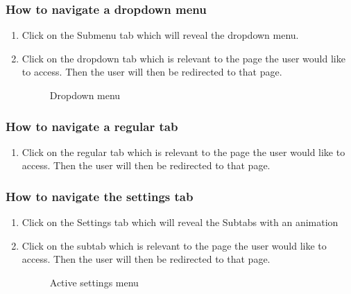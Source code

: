 \documentclass[14pt, a4paper]{article}
\begin{document}
\subsubsection{How to navigate a dropdown menu}
\begin{enumerate}
\item Click on the Submenu tab which will reveal the dropdown menu.
\item Click on the dropdown tab which is relevant to the page the user would like to access. Then the user will then be redirected to that page.
\begin{figure}[H]
\centerline{}
\caption{Dropdown menu}
\label{fig:navbar3}
\end{figure}
\end{enumerate}
\subsubsection{How to navigate a regular tab}
\begin{enumerate}
\item Click on the regular tab which is relevant to the page the user would like to access. Then the user will then be redirected to that page.
\end{enumerate}
\subsubsection{How to navigate the settings tab}
\begin{enumerate}
\item Click on the Settings tab which will reveal the Subtabs with an animation
\item Click on the subtab which is relevant to the page the user would like to access. Then the user will then be redirected to that page.
\begin{figure}[H]
\centerline{}
\caption{Active settings menu}
\label{fig:navbar3}
\end{figure}
\end{enumerate}
\end{document}
